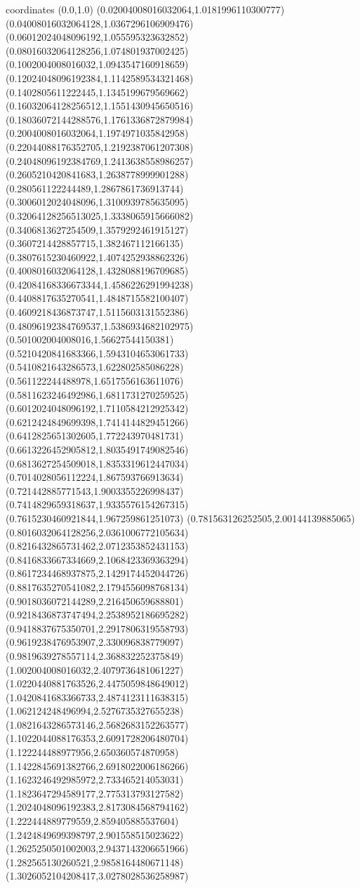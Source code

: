 coordinates {%
(0.0,1.0)
(0.02004008016032064,1.0181996110300777)
(0.04008016032064128,1.0367296106909476)
(0.06012024048096192,1.055595323632852)
(0.08016032064128256,1.074801937002425)
(0.1002004008016032,1.0943547160918659)
(0.12024048096192384,1.1142589534321468)
(0.1402805611222445,1.1345199679569662)
(0.16032064128256512,1.1551430945650516)
(0.18036072144288576,1.1761336872879984)
(0.2004008016032064,1.1974971035842958)
(0.22044088176352705,1.2192387061207308)
(0.24048096192384769,1.2413638558986257)
(0.2605210420841683,1.2638778999901288)
(0.280561122244489,1.2867861736913744)
(0.3006012024048096,1.3100939785635095)
(0.32064128256513025,1.3338065915666082)
(0.3406813627254509,1.3579292461915127)
(0.3607214428857715,1.382467112166135)
(0.3807615230460922,1.4074252938862326)
(0.4008016032064128,1.4328088196709685)
(0.42084168336673344,1.4586226291994238)
(0.4408817635270541,1.4848715582100407)
(0.4609218436873747,1.5115603131552386)
(0.48096192384769537,1.5386934682102975)
(0.501002004008016,1.56627544150381)
(0.5210420841683366,1.5943104653061733)
(0.5410821643286573,1.622802585086228)
(0.561122244488978,1.6517556163611076)
(0.5811623246492986,1.6811731270259525)
(0.6012024048096192,1.7110584212925342)
(0.6212424849699398,1.7414144829451266)
(0.6412825651302605,1.772243970481731)
(0.6613226452905812,1.8035491749082546)
(0.6813627254509018,1.8353319612447034)
(0.7014028056112224,1.867593766913634)
(0.721442885771543,1.9003355226998437)
(0.7414829659318637,1.9335576154267315)
(0.7615230460921844,1.967259861251073)
(0.781563126252505,2.00144139885065)
(0.8016032064128256,2.0361006772105634)
(0.8216432865731462,2.0712353852431153)
(0.8416833667334669,2.1068423369363294)
(0.8617234468937875,2.1429174452044726)
(0.8817635270541082,2.1794556098768134)
(0.9018036072144289,2.216450659688801)
(0.9218436873747494,2.2538952186695282)
(0.9418837675350701,2.2917806319558793)
(0.9619238476953907,2.330096838779097)
(0.9819639278557114,2.368832252375849)
(1.002004008016032,2.4079736481061227)
(1.0220440881763526,2.4475059848649012)
(1.0420841683366733,2.4874123111638315)
(1.062124248496994,2.5276735327655238)
(1.0821643286573146,2.5682683152263577)
(1.1022044088176353,2.6091728206480704)
(1.122244488977956,2.650360574870958)
(1.1422845691382766,2.6918022006186266)
(1.1623246492985972,2.733465214053031)
(1.1823647294589177,2.775313793127582)
(1.2024048096192383,2.8173084568794162)
(1.222444889779559,2.859405885537604)
(1.2424849699398797,2.901558515023622)
(1.2625250501002003,2.9437143206651966)
(1.282565130260521,2.9858164480671148)
(1.3026052104208417,3.0278028536258987)
}

